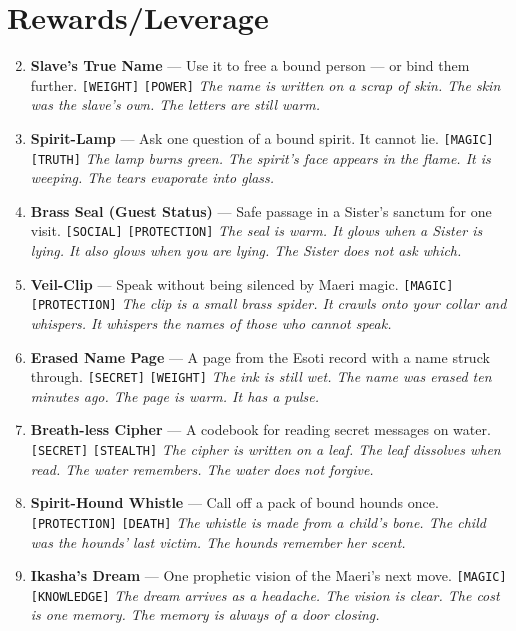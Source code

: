 \section*{ Rewards/Leverage}
\label{sec:ashaan-rewards}
\begin{enumerate}
\setcounter{enumi}{1}
\item \textbf{Slave's True Name} --- Use it to free a bound person --- or bind them further. \texttt{[WEIGHT]} \texttt{[POWER]}
  \hfill \textit{The name is written on a scrap of skin. The skin was the slave's own. The letters are still warm.}
\item \textbf{Spirit-Lamp} --- Ask one question of a bound spirit. It cannot lie. \texttt{[MAGIC]} \texttt{[TRUTH]}
  \hfill \textit{The lamp burns green. The spirit's face appears in the flame. It is weeping. The tears evaporate into glass.}
\item \textbf{Brass Seal (Guest Status)} --- Safe passage in a Sister's sanctum for one visit. \texttt{[SOCIAL]} \texttt{[PROTECTION]}
  \hfill \textit{The seal is warm. It glows when a Sister is lying. It also glows when you are lying. The Sister does not ask which.}
\item \textbf{Veil-Clip} --- Speak without being silenced by Maeri magic. \texttt{[MAGIC]} \texttt{[PROTECTION]}
  \hfill \textit{The clip is a small brass spider. It crawls onto your collar and whispers. It whispers the names of those who cannot speak.}
\item \textbf{Erased Name Page} --- A page from the Esoti record with a name struck through. \texttt{[SECRET]} \texttt{[WEIGHT]}
  \hfill \textit{The ink is still wet. The name was erased ten minutes ago. The page is warm. It has a pulse.}
\item \textbf{Breath-less Cipher} --- A codebook for reading secret messages on water. \texttt{[SECRET]} \texttt{[STEALTH]}
  \hfill \textit{The cipher is written on a leaf. The leaf dissolves when read. The water remembers. The water does not forgive.}
\item \textbf{Spirit-Hound Whistle} --- Call off a pack of bound hounds once. \texttt{[PROTECTION]} \texttt{[DEATH]}
  \hfill \textit{The whistle is made from a child's bone. The child was the hounds' last victim. The hounds remember her scent.}
\item \textbf{Ikasha's Dream} --- One prophetic vision of the Maeri's next move. \texttt{[MAGIC]} \texttt{[KNOWLEDGE]}
  \hfill \textit{The dream arrives as a headache. The vision is clear. The cost is one memory. The memory is always of a door closing.}

\end{enumerate}
